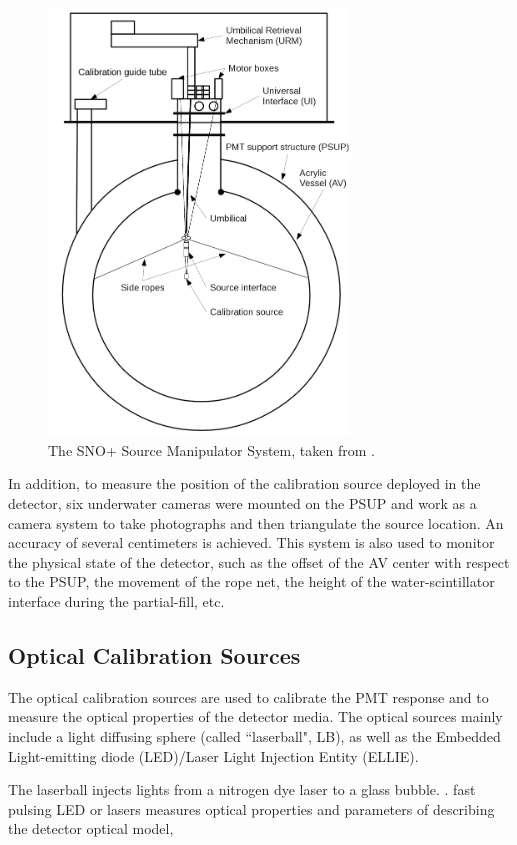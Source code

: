 \begin{figure}[!htb]
	\centering
	\includegraphics[width=8cm]{SMS.png}
	\caption{The SNO+ Source Manipulator System, taken from \cite{snop_jinst}.}
	\label{sms}
\end{figure}

In addition, to measure the position of the calibration source deployed in the detector, six underwater cameras were mounted on the PSUP and work as a camera system to take photographs and then triangulate the source location. An accuracy of several centimeters is achieved. This system is also used to monitor the physical state of the detector, such as the offset of the AV center with respect to the PSUP, the movement of the rope net, the height of the water-scintillator interface during the partial-fill, etc\cite{singh2020underwater,snop_jinst}.

\subsection{Optical Calibration Sources}
The optical calibration sources are used to calibrate the PMT response and to measure the optical properties of the detector media. The optical sources mainly include a light diffusing sphere (called ``laserball", LB), as well as the Embedded Light-emitting diode (LED)/Laser Light Injection Entity (ELLIE)\cite{snop_jinst}.

The laserball injects lights from a nitrogen dye laser to a glass bubble.
\cite{anderson2021optical}.
fast pulsing LED or lasers
measures optical properties and parameters of describing the detector optical model,

